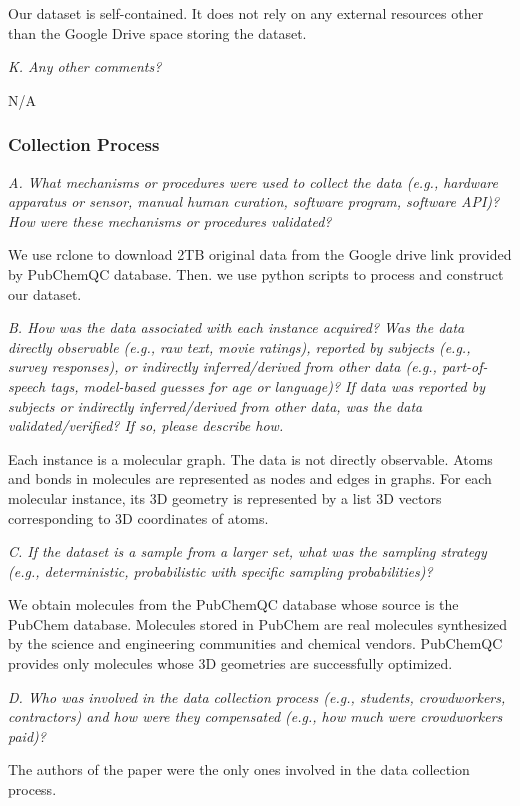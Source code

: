 \documentclass{article}
\begin{document}
Our dataset is self-contained. It does not rely on any external resources other than the Google Drive space storing the dataset.

\textit{K. Any other comments?}

N/A

\subsubsection{Collection Process}

\textit{A. What mechanisms or procedures were used to collect the data (e.g., hardware apparatus or sensor, manual human curation, software program, software API)? How were these mechanisms or procedures validated?}

We use rclone to download 2TB original data from the Google drive link provided by PubChemQC database. Then. we use python scripts to process and construct our dataset. 

\textit{B. How was the data associated with each instance acquired? Was the data directly observable (e.g., raw text, movie ratings), reported by subjects (e.g., survey responses), or indirectly inferred/derived from other data (e.g., part-of- speech tags, model-based guesses for age or language)? If data was reported by subjects or indirectly inferred/derived from other data, was the data validated/verified? If so, please describe how.}

Each instance is a molecular graph. The data is not directly observable. Atoms and bonds in molecules are represented as nodes and edges in graphs. For each molecular instance, its 3D geometry is represented by a list 3D vectors corresponding to 3D coordinates of atoms.

\textit{C. If the dataset is a sample from a larger set, what was the sampling strategy (e.g., deterministic, probabilistic with specific sampling probabilities)?}

We obtain molecules from the PubChemQC database whose source is the PubChem database. Molecules stored in PubChem are real molecules synthesized by the science and engineering communities and chemical vendors. PubChemQC provides only molecules whose 3D geometries are successfully optimized. 

\textit{D. Who was involved in the data collection process (e.g., students, crowdworkers, contractors) and how were they compensated (e.g., how much were crowdworkers paid)?}

The authors of the paper were the only ones involved in the data collection process.
\end{document}
